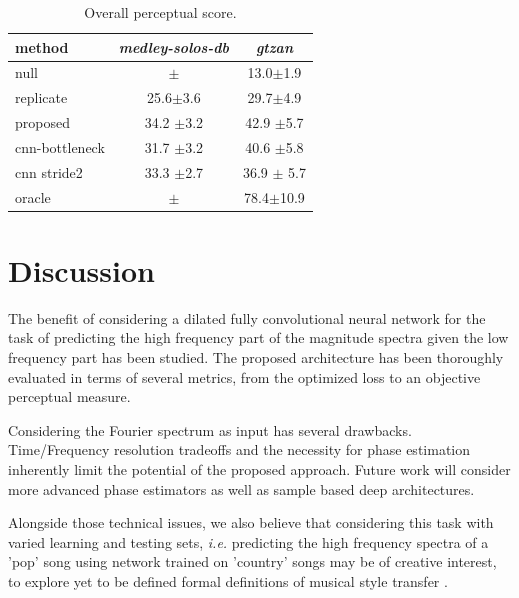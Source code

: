 \documentclass{article}
\newcommand{\fg}[1]{\textcolor{red}{FG : #1}}
\begin{document}
\begin{table}[t]
  \caption{Overall perceptual score.}
  \label{tab:ops}
\begin{center}
\begin{tabular}{lcc}
method & \textit{medley-solos-db} & \textit{gtzan} \\
\hline
null & $\pm$ & 13.0$\pm$1.9  \\
replicate & 25.6$\pm$3.6 & 29.7$\pm$4.9 \\
\hline
proposed & 34.2 $\pm$3.2 & 42.9 $\pm$5.7 \\
cnn-bottleneck & 31.7 $\pm$3.2 & 40.6 $\pm$5.8 \\
cnn stride2 & 33.3 $\pm$2.7 & 36.9 $\pm$ 5.7 \\
\hline
oracle  & $\pm$ & 78.4$\pm$10.9  \\
\end{tabular}
\end{center}
\vspace{-4mm}
\end{table}

\section{Discussion}
\label{sec:discussion}

The benefit of considering a dilated fully convolutional neural network for the task of predicting the high frequency part of the magnitude spectra given the low frequency part has been studied. The proposed architecture has been thoroughly evaluated in terms of several metrics, from the optimized loss to an objective perceptual measure.

Considering the Fourier spectrum as input has several drawbacks. Time/Frequency resolution tradeoffs and the necessity for phase estimation inherently limit the potential of the proposed approach. Future work will consider more advanced phase estimators as well as sample based deep architectures. %




Alongside those technical issues, we also believe that considering this task with varied learning and testing sets, \textit{i.e.} predicting the high frequency spectra of a 'pop' song using network trained on 'country' songs may be of creative interest, to explore yet to be defined formal definitions of musical style transfer \cite{dai2018music}.


\vfill\pagebreak




\end{document}
